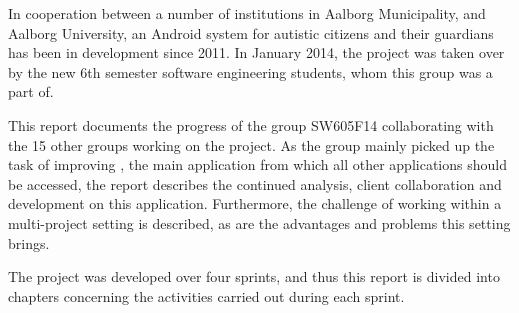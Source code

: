In cooperation between a number of institutions in Aalborg Municipality, and Aalborg University, an Android system for autistic citizens and their guardians has been in development since 2011.
In January 2014, the project was taken over by the new 6th semester software engineering students, whom this group was a part of.

This report documents the progress of the group SW605F14 collaborating with the 15 other groups working on the project.
As the group mainly picked up the task of improving \launcher, the main application from which all other applications should be accessed, the report describes the continued analysis, client collaboration and development on this application.
Furthermore, the challenge of working within a multi-project setting is described, as are the advantages and problems this setting brings.

The project was developed over four sprints, and thus this report is divided into chapters concerning the activities carried out during each sprint.
